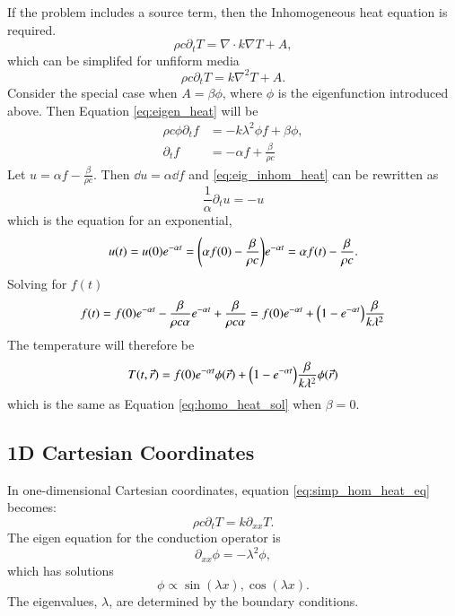 \documentclass[letterpaper,12pt]{article}
\begin{document}
If the problem includes a source term, then the Inhomogeneous heat equation is required.
\begin{equation}
  \label{eq:inhom_heat_eq}
  \rho c \partial_t T = \nabla \cdot k \nabla T + A,
\end{equation}
which can be simplifed for unfiform media
\begin{equation}
  \label{eq:simp_inhom_heat_eq}
  \rho c \partial_t T = k \nabla^2 T + A.
\end{equation}
Consider the special case when $A = \beta \phi$, where $\phi$ is the eigenfunction introduced
above. Then  Equation \ref{eq:eigen_heat} will be
\begin{align}
  \rho c \phi \partial_t f  &= -k \lambda^2 \phi f + \beta \phi ,\\
  \label{eq:eig_inhom_heat}
  \partial_t f  &= -\alpha f + \frac{\beta}{\rho c}
\end{align}
Let $u = \alpha f - \frac{\beta}{\rho c}$.
Then $\dd u = \alpha \dd f$ and \ref{eq:eig_inhom_heat} can
be rewritten as
\begin{equation}
  \frac{1}{\alpha} \partial_t u = -u
\end{equation}
which is the equation for an exponential,
\begin{align}
  u(t) = u(0)e^{-\alpha t} = \qty(\alpha  f(0) - \frac{\beta}{\rho c})e^{-\alpha t} = \alpha f(t) - \frac{\beta}{\rho c}.
\end{align}
Solving for $f(t)$
\begin{align}
 f(t)
 = f(0) e^{-\alpha t} - \frac{\beta}{\rho c \alpha} e^{-\alpha t} + \frac{\beta}{\rho c \alpha}
 = f(0) e^{-\alpha t} + \qty(1 - e^{-\alpha t})\frac{\beta}{k\lambda^2}
\end{align}
The temperature will therefore be
\begin{equation}
  \label{eq:inhomo_heat_sol}
  T(t,\vec{r}) =
  f(0) e^{-\alpha t}\phi(\vec{r}) + \qty(1 - e^{-\alpha t})\frac{\beta}{k \lambda^2} \phi(\vec{r})
\end{equation}
which is the same as Equation \ref{eq:homo_heat_sol} when $\beta = 0$.

\subsection{1D Cartesian Coordinates}
In one-dimensional Cartesian coordinates, equation \ref{eq:simp_hom_heat_eq} becomes:
\begin{equation}
  \label{eq:1d_simp_heat_eq}
  \rho c \partial_t T = k \partial_{xx} T.
\end{equation}
The eigen equation for the conduction operator is
\begin{equation}
  \label{eq:1d_eigen_eq}
  \partial_{xx} \phi = -\lambda^2 \phi,
\end{equation}
which has solutions
\begin{equation}
  \phi \propto \sin(\lambda x), \cos(\lambda x).
\end{equation}
The eigenvalues, $\lambda$, are determined by the boundary conditions.
\end{document}
